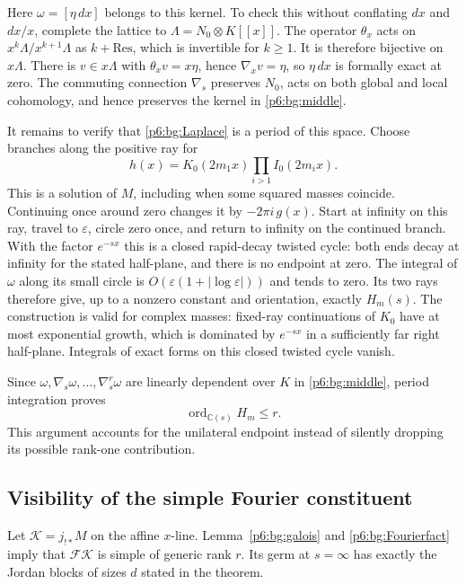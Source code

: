 \documentclass[11pt,a4paper]{article}
\theoremstyle{definition}
\theoremstyle{remark}
\numberwithin{equation}{section}
\begin{document}
Here $\omega=[\eta\,dx]$ belongs to this kernel.  To check this
without conflating $dx$ and $dx/x$, complete the lattice to
$\Lambda=N_0\otimes K[[x]]$.  The operator $\theta_x$ acts on
$x^k\Lambda/x^{k+1}\Lambda$ as $k+\mathrm{Res}$, which is
invertible for $k\ge1$.  It is therefore bijective on $x\Lambda$.
There is $v\in x\Lambda$ with $\theta_xv=x\eta$, hence
$\nabla_xv=\eta$, so $\eta\,dx$ is formally exact at zero.
The commuting connection $\nabla_s$ preserves $N_0$, acts on
both global and local cohomology, and hence preserves the kernel
in \eqref{p6:bg:middle}.

It remains to verify that \eqref{p6:bg:Laplace} is a period of this
space.  Choose branches along the positive ray for
\[
 h(x)=K_0(2m_1x)\prod_{i>1}I_0(2m_ix).
\]
This is a solution of $M$, including when some squared masses
coincide.  Continuing once around zero changes it by
$-2\pi i\,g(x)$.  Start at infinity on this ray, travel to
$\varepsilon$, circle zero once, and return to infinity on the
continued branch.  With the factor $e^{-sx}$ this is a closed
rapid-decay twisted cycle: both ends decay at infinity for the
stated half-plane, and there is no endpoint at zero.  The integral
of $\omega$ along its small circle is
$O(\varepsilon(1+|\log\varepsilon|))$ and tends to zero.
Its two rays therefore give, up to a nonzero constant and orientation,
exactly $H_m(s)$.  The construction is valid for complex masses:
fixed-ray continuations of $K_0$ have at most exponential growth,
which is dominated by $e^{-sx}$ in a sufficiently far right half-plane.
Integrals of exact forms on this closed twisted cycle vanish.

Since $\omega,\nabla_s\omega,\ldots,\nabla_s^r\omega$ are
linearly dependent over $K$ in \eqref{p6:bg:middle}, period integration
proves
\begin{equation}\label{p6:bg:upper}
                         \operatorname{ord}_{\mathbb C(s)}H_m\le r.
\end{equation}
This argument accounts for the unilateral endpoint instead of
silently dropping its possible rank-one contribution.

\subsection{Visibility of the simple Fourier constituent}

Let $\mathcal K=j_{!*}M$ on the affine $x$-line.  Lemma~\ref{p6:bg:galois}
and \eqref{p6:bg:Fourierfact} imply that $\mathcal F\mathcal K$ is
simple of generic rank $r$.  Its germ at $s=\infty$ has exactly
the Jordan blocks of sizes $d$ stated in the theorem.
\end{document}
